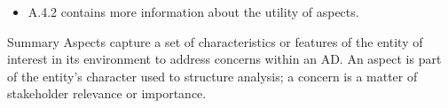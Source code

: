 \documentclass[10pt,letterpaper]{article}
\begin{document}
\begin{CornellNotesTable}
{\begin{itemize}[leftmargin=*,nosep,topsep=1pt]
\item A.4.2 contains more information about the utility of aspects.
\end{itemize}}
\end{CornellNotesTable}


\begin{CornellSummaryBox}{Summary}
Aspects capture a set of characteristics or features of the entity of interest in its environment to address concerns within an AD. An aspect is part of the entity’s character used to structure analysis; a concern is a matter of stakeholder relevance or importance.
\end{CornellSummaryBox}
\end{document}
